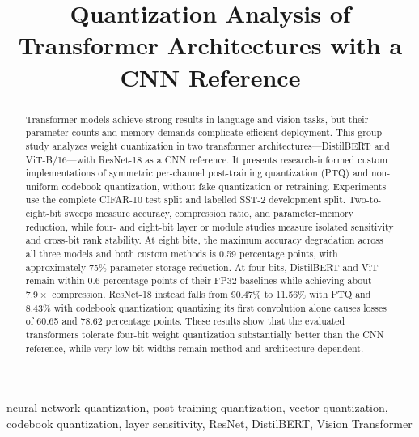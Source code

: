 \documentclass[conference]{IEEEtran}
\begin{document}
\pagestyle{plain}

\title{Quantization Analysis of Transformer Architectures with a CNN Reference}

\author{
}

\maketitle
\thispagestyle{plain}

\begin{abstract}
Transformer models achieve strong results in language and vision tasks, but their parameter counts and memory demands complicate efficient deployment. This group study analyzes weight quantization in two transformer architectures---DistilBERT and ViT-B/16---with ResNet-18 as a CNN reference. It presents research-informed custom implementations of symmetric per-channel post-training quantization (PTQ) and non-uniform codebook quantization, without fake quantization or retraining. Experiments use the complete CIFAR-10 test split and labelled SST-2 development split. Two-to-eight-bit sweeps measure accuracy, compression ratio, and parameter-memory reduction, while four- and eight-bit layer or module studies measure isolated sensitivity and cross-bit rank stability. At eight bits, the maximum accuracy degradation across all three models and both custom methods is 0.59 percentage points, with approximately 75\% parameter-storage reduction. At four bits, DistilBERT and ViT remain within 0.6 percentage points of their FP32 baselines while achieving about $7.9\times$ compression. ResNet-18 instead falls from 90.47\% to 11.56\% with PTQ and 8.43\% with codebook quantization; quantizing its first convolution alone causes losses of 60.65 and 78.62 percentage points. These results show that the evaluated transformers tolerate four-bit weight quantization substantially better than the CNN reference, while very low bit widths remain method and architecture dependent.
\end{abstract}

\begin{IEEEkeywords}
neural-network quantization, post-training quantization, vector quantization, codebook quantization, layer sensitivity, ResNet, DistilBERT, Vision Transformer
\end{IEEEkeywords}
\end{document}
